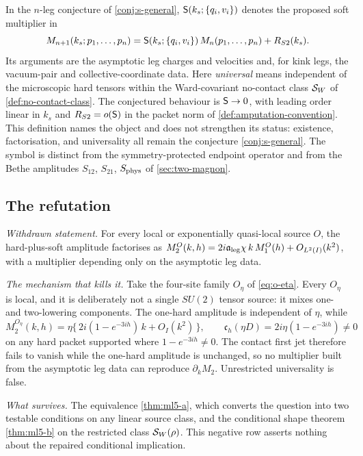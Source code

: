 \begin{definition}
\label{def:soft-multiplier}
In the $n$-leg conjecture of \cref{conj:s-general}, $\mathsf{S}(k_s;\{q_i,v_i\})$
denotes the proposed soft multiplier in
\begin{equation}
  M_{n+1}(k_s;p_1,\dots,p_n)=\mathsf{S}(k_s;\{q_i,v_i\})\,M_n(p_1,\dots,p_n)
  +R_{S2}(k_s).
  \label{eq:n-leg-factorisation}
\end{equation}
Its arguments are the asymptotic leg charges and velocities and, for kink
legs, the vacuum-pair and collective-coordinate data. Here \emph{universal}
means independent of the microscopic hard tensors within the Ward-covariant
no-contact class $\mathcal{S}_W$ of \cref{def:no-contact-class}. The conjectured
behaviour is $\mathsf{S}\to0$, with leading order linear in $k_s$ and
$R_{S2}=o(\mathsf{S})$ in the packet norm of \cref{def:amputation-convention}.
This definition names the object and does not strengthen its status:
existence, factorisation, and universality all remain the conjecture
\cref{conj:s-general}. The symbol is distinct from the symmetry-protected
endpoint operator and from the Bethe amplitudes $S_{12}$, $S_{21}$,
$S_{\rm phys}$ of \cref{sec:two-magnon}.
\end{definition}


\subsection{The refutation}

\begin{refutedclaim}
\label{ref:ml5-unrestricted}
\statusRefuted

\emph{Withdrawn statement.} For every local or exponentially quasi-local
source $O$, the hard-plus-soft amplitude factorises as
$M_2^O(k,h)=2i\mathfrak{a}_{\mathrm{leg}}\chi\,k\,M_1^O(h)+O_{L^2(I)}(k^2)$, with a multiplier
depending only on the asymptotic leg data.

\emph{The mechanism that kills it.} Take the four-site family $O_\eta$ of
\cref{eq:o-eta}. Every $O_\eta$ is local, and it is deliberately not a single
$SU(2)$ tensor source: it mixes one- and two-lowering components. The
one-hard amplitude is independent of $\eta$, while
\begin{equation}
  M_2^{O_\eta}(k,h)=\eta\bigl\{\,2i(1-e^{-3ih})\,k+O_I(k^2)\,\bigr\},
  \qquad
  \mathfrak c_h(\eta D)=2i\eta(1-e^{-3ih})\neq0
  \label{eq:o-eta-obstruction}
\end{equation}
on any hard packet supported where $1-e^{-3ih}\neq0$. The contact first jet
therefore fails to vanish while the one-hard amplitude is unchanged, so no
multiplier built from the asymptotic leg data can reproduce
$\partial_kM_2$. Unrestricted universality is false.

\emph{What survives.} The equivalence \cref{thm:ml5-a}, which converts the
question into two testable conditions on any linear source class, and the
conditional shape theorem \cref{thm:ml5-b} on the restricted class
$\mathcal{S}_W(\rho)$. This negative row asserts nothing about the repaired
conditional implication.
\end{refutedclaim}

